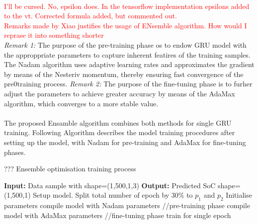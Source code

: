 \\
\textcolor{red}{I'll be cursed. No, epsilon does. In the tensorflow implementation epsilons added to the vt. Corrected formula added, but commented out. \\
Remarks made by Xiao justifies the usage of ENsemble algorithm. How would I reprase it into something shorter}\\
\textit{Remark 1:} The purpose of the pre-training phase os to endow GRU model with the approppriate parameters to capture inherent featires of the training samples. The Nadam algorithm uses adaptive learning rates and approximates the gradient by means of the Nesteriv momentum, thereby ensuring fast convergence of the pre0training process.
\textit{Remark 2:} The purpose of the fine-tuning phase is to furher adjust the parameters to achieve greater accuracy by means of the AdaMax algorithm, which converges to a more stable value. \\ \\
The proposed Ensamble algorithm combines both methods for single GRU training.
Following Algorithm describes the model training procedures after setting up the model, with Nadam for pre-training and AdaMax for fine-tuning phases.
\begin{algorithm}
    \caption{??? Ensemble optimisation training process}
        \begin{algorithmic}[1]
            \STATE \textbf{Input:} Data sample with shape=(1,500,1,3) 
            \STATE \textbf{Output:} Predicted SoC shape=(1,500,1)
            \STATE Setup model. Split total number of epoch by 30\% to $p_{1}$ and $p_{2}$
            \STATE Initialise parameters
                    \STATE compile model with Nadam parameters //pre-training phase
                \ELSE
                    \STATE compile model with AdaMax parameters //fine-tuning phase
                \ENDIF
                \STATE train for single epoch
            \ENDWHILE
        \end{algorithmic}
    \label{alg:ENS}
\end{algorithm}
